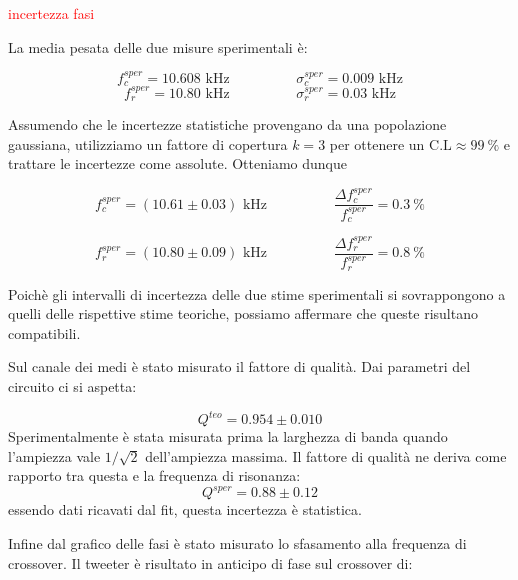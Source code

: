 \documentclass[12pt,italian]{article}
\newcommand{\err}[1]{\textcolor{red}{#1}}
\begin{document}
\err{incertezza fasi}

La media pesata delle due misure sperimentali è:

\begin{equation*}
	f_{c}^{sper} = 10.608 \text{ kHz}  \hspace{2cm}  \sigma_c^{sper} = 0.009 \text{ kHz}
\end{equation*}
\begin{equation*}
	f_{r}^{sper} = 10.80 \text{ kHz}  \hspace{2cm}  \sigma_r^{sper} = 0.03  \text{ kHz}
\end{equation*}

Assumendo che le incertezze statistiche provengano da una popolazione
gaussiana, utilizziamo un fattore di copertura $k = 3$ per ottenere un
$\text{C.L}\approx 99 \ \% $ e trattare le incertezze come assolute. Otteniamo
dunque

\begin{equation*}
	f_{c}^{sper} = (10.61 \pm 0.03) \text{ kHz} \hspace{2cm} \frac{\Delta f_{c}^{sper}}{f_{c}^{sper}} = 0.3 \ \%
\end{equation*}

\begin{equation*}
	f_{r}^{sper} = (10.80 \pm 0.09) \text{ kHz} \hspace{2cm} \frac{\Delta f_{r}^{sper}}{f_{r}^{sper}} = 0.8 \ \%
\end{equation*}

Poichè gli intervalli di incertezza delle due stime sperimentali si
sovrappongono a quelli delle rispettive stime teoriche, possiamo affermare che
queste risultano compatibili.

Sul canale dei medi è stato misurato il fattore di qualità. Dai parametri del
circuito ci si aspetta:

\begin{equation*}
	Q^{teo} = 0.954 \pm 0.010
\end{equation*}
Sperimentalmente è stata misurata prima la larghezza di banda
quando l'ampiezza vale $1/\sqrt{2}$ dell'ampiezza massima. Il fattore di
qualità ne deriva come rapporto tra questa e la frequenza di risonanza:
\begin{equation*}
	Q^{sper} = 0.88 \pm 0.12
\end{equation*}
essendo dati ricavati dal fit, questa incertezza è statistica.

Infine dal grafico delle fasi è stato misurato lo sfasamento alla frequenza di
crossover. Il tweeter è risultato in anticipo di fase sul crossover di:
\end{document}

